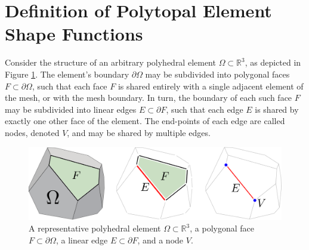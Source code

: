 \section{Definition of Polytopal Element Shape Functions}

	Consider the structure of an arbitrary polyhedral element $\Omega \subset \mathbb{R}^3$, as depicted in Figure \ref{fig:polyhedral_element}. The element's boundary $\partial \Omega$ may be subdivided into polygonal faces $F \subset \partial \Omega$, such that each face $F$ is shared entirely with a single adjacent element of the mesh, or with the mesh boundary. In turn, the boundary of each such face $F$ may be subdivided into linear edges $E \subset \partial F$, such that each edge $E$ is shared by exactly one other face of the element. The end-points of each edge are called nodes, denoted $V$, and may be shared by multiple edges.
	
\begin{figure} [!ht]
	\centering
	\includegraphics[width = 6.0in]{figures/polyhedron_decomposition.pdf}
	\caption{A representative polyhedral element $\Omega \subset \mathbb{R}^3$, a polygonal face $F \subset \partial \Omega$, a linear edge $E \subset \partial F$, and a node $V$.}
	\label{fig:polyhedral_element}
\end{figure}
	
